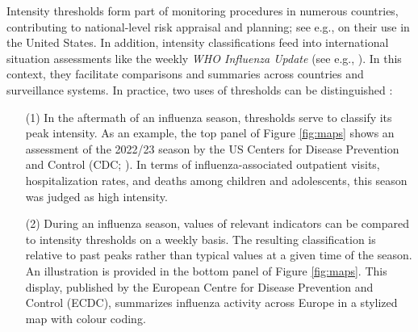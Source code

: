 \documentclass[12pt]{article}
\begin{document}
Intensity thresholds form part of monitoring procedures in numerous countries, contributing to national-level risk appraisal and planning; see e.g., \cite{CDC2024} on their use in the United States. In addition, intensity classifications feed into international situation assessments like the weekly \textit{WHO Influenza Update} (see e.g., \citealt{WHO2024}). In this context, they facilitate comparisons and summaries across countries and surveillance systems. In practice, two uses of thresholds can be distinguished \citep{CDC2024}:
\begin{itemize}
\item[(1)] In the aftermath of an influenza season, thresholds serve to classify its peak intensity. As an example, the top panel of Figure \ref{fig:maps} shows an assessment of the 2022/23 season by the US Centers for Disease Prevention and Control (CDC; \citealt{White2023}). In terms of influenza-associated outpatient visits, hospitalization rates, and deaths among children and adolescents, this season was judged as high intensity.
\item[(2)] During an influenza season, values of relevant indicators can be compared to intensity thresholds on a weekly basis. The resulting classification is relative to past peaks rather than typical values at a given time of the season. An illustration is provided in the bottom panel of Figure \ref{fig:maps}. This display, published by the European Centre for Disease Prevention and Control (ECDC), summarizes influenza activity across Europe in a stylized map with colour coding.
\end{itemize}
\end{document}
